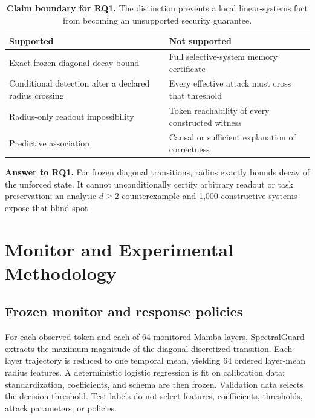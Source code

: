 \documentclass[sigconf]{acmart}
\newcommand{\answerbox}[2]{\par\smallskip\noindent
  \colorbox{SGPale}{\parbox{\dimexpr\columnwidth-2\fboxsep\relax}{
  \textbf{Answer to #1.} #2}}\par\smallskip}
\begin{document}
\begin{table}[t]
\caption{\textbf{Claim boundary for RQ1.} The distinction prevents a local
linear-systems fact from becoming an unsupported security guarantee.}
\label{tab:claim-boundary}
\centering\small
\begin{tabularx}{\columnwidth}{@{}YY@{}}
\toprule
Supported & Not supported \\
\midrule
Exact frozen-diagonal decay bound & Full selective-system memory certificate \\
Conditional detection after a declared radius crossing & Every effective attack must cross that threshold \\
Radius-only readout impossibility & Token reachability of every constructed witness \\
Predictive association & Causal or sufficient explanation of correctness \\
\bottomrule
\end{tabularx}
\end{table}

\answerbox{RQ1}{For frozen diagonal transitions, radius exactly bounds decay of
the unforced state. It cannot unconditionally certify arbitrary readout or task
preservation; an analytic $d\ge2$ counterexample and 1,000 constructive systems
expose that blind spot.}

\section{Monitor and Experimental Methodology}
\subsection{Frozen monitor and response policies}
For each observed token and each of 64 monitored Mamba layers, SpectralGuard
extracts the maximum magnitude of the diagonal discretized transition. Each
layer trajectory is reduced to one temporal mean, yielding 64 ordered
layer-mean radius features. A deterministic logistic
regression is fit on calibration data; standardization, coefficients, and
schema are then frozen. Validation data selects the decision threshold. Test
labels do not select features, coefficients, thresholds, attack parameters, or
policies.
\end{document}
